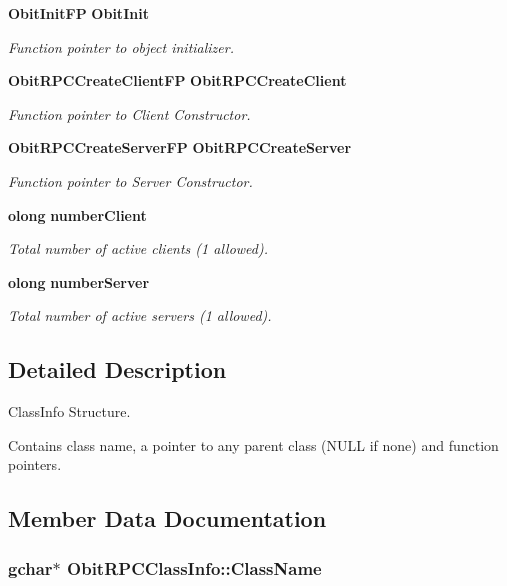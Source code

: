 \begin{CompactItemize}
{\bf Obit\-Init\-FP} {\bf Obit\-Init}
\begin{CompactList}\small\item\em Function pointer to object initializer. \item\end{CompactList}\item 
{\bf Obit\-RPCCreate\-Client\-FP} {\bf Obit\-RPCCreate\-Client}
\begin{CompactList}\small\item\em Function pointer to Client Constructor. \item\end{CompactList}\item 
{\bf Obit\-RPCCreate\-Server\-FP} {\bf Obit\-RPCCreate\-Server}
\begin{CompactList}\small\item\em Function pointer to Server Constructor. \item\end{CompactList}\item 
{\bf olong} {\bf number\-Client}
\begin{CompactList}\small\item\em Total number of active clients (1 allowed). \item\end{CompactList}\item 
{\bf olong} {\bf number\-Server}
\begin{CompactList}\small\item\em Total number of active servers (1 allowed). \item\end{CompactList}\end{CompactItemize}


\subsection{Detailed Description}
Class\-Info Structure. 

Contains class name, a pointer to any parent class (NULL if none) and function pointers. 



\subsection{Member Data Documentation}
\subsubsection{\setlength{\rightskip}{0pt plus 5cm}gchar$\ast$ {\bf Obit\-RPCClass\-Info::Class\-Name}}\label{structObitRPCClassInfo_o2}


